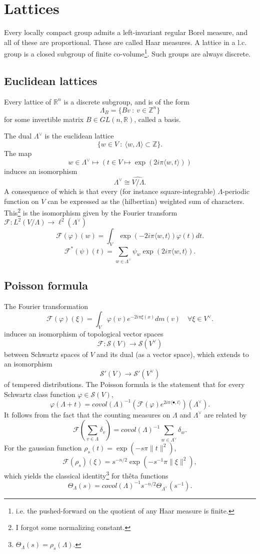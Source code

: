 \documentclass{article}
\begin{document}
\newpage	%
\section{Lattices}

Every locally compact group admits a left-invariant regular Borel measure, and all of these are proportional. These are called Haar measures. A lattice in a l.c. group is a closed subgroup of finite co-volume\footnote{i.e. the pushed-forward on the quotient of any Haar measure is finite.}. Such groups are always discrete. 

\subsection{Euclidean lattices}
Every lattice of $\mathbb R^n$ is a discrete subgroup, and is of the form 
\[\Lambda_B = \{ Bv \ : \ v\in \mathbb Z^n\} \]
for some invertible matrix $B\in GL(n,\mathbb R)$, called a basis. 

The dual $\Lambda^\vee$ is the euclidean lattice
\[\{ w \in V \ : \  \langle w , \Lambda \rangle \subset \mathbb Z \}.\]
The map 
$$w \in \Lambda^\vee \mapsto \left(t\in V \mapsto \exp(2i\pi \langle w,t \rangle)\right)$$ 
induces an isomorphism 
\[\Lambda^\vee \cong \widehat{V/\Lambda}.\] 
A consequence of which is that every (for instance square-integrable) $\Lambda$-periodic function on $V$ can be expressed as the (hilbertian) weighted sum of characters. This\footnote{I forgot some normalizing constant.} is the isomorphism given by the Fourier transform $\mathcal F : L^2(V/\Lambda ) \rightarrow \ell^2(\Lambda^\vee) $
\[\mathcal F(\varphi)(w) = \int_V \exp(-2i\pi \langle w,t \rangle) \varphi(t)dt. \]
\[\mathcal F^{*}(\psi)(t) = \sum_{w\in\Lambda^\vee} \psi_w \exp(2i\pi \langle w,t \rangle) . \]

\subsection{Poisson formula}
The Fourier transformation 
\[\mathcal F(\varphi ) (\xi ) = \int_V \varphi(v)e^{-2i\pi \xi(x)} dm(v) \quad\forall \xi \in V^\vee.\]
induces an isomorphism of topological vector spaces
\[\mathcal F : \mathcal S(V) \rightarrow \mathcal S(V^\vee)\]
between Schwartz spaces of $V$ and its dual (as a vector space), which extends to an isomorphism
\[\mathcal S'(V) \rightarrow \mathcal S'(V^\vee)\]
of tempered distributions.
The Poisson formula is the statement that for every Schwartz class function $\varphi\in\mathcal S(V)$, 
\[ \varphi (\Lambda + t) = covol(\Lambda)^{-1}(\mathcal F(\varphi)e^{2i\pi \langle \bullet , t\rangle }) (\Lambda^\vee).\]
It follows from the fact that the counting measures on $\Lambda$ and $\Lambda^\vee$ are related by 
\[\mathcal F(\sum_{v\in \Lambda} \delta_{v} ) = covol(\Lambda)^{-1}\sum_{w\in \Lambda^\vee} \delta_w .\]
For the gaussian function $\rho_s(t) = \exp(-s\pi\|t\|^2)$, 
\[\mathcal F(\rho_s)(\xi)= s^{-n/2}\exp(-s^{-1}\pi\|\xi\|^2 ),\]
which yields the classical identity\footnote{$\Theta_{\Lambda}(s) = \rho_s(\Lambda)$.} for thêta functions
\[ \Theta_{\Lambda}(s) = covol(\Lambda)^{-1}s^{-n/2}\Theta_{\Lambda^\vee}(s^{-1}).\]
\end{document}
